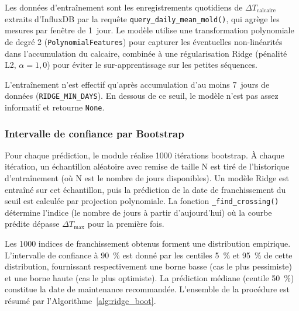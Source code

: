 Les données d'entraînement sont les enregistrements quotidiens de \(\Delta T_{\text{calcaire}}\) extraits d'InfluxDB par la requête \texttt{query\_daily\_mean\_mold()}, qui agrège les mesures par fenêtre de 1~jour. Le modèle utilise une transformation polynomiale de degré 2 (\texttt{PolynomialFeatures}) pour capturer les éventuelles non-linéarités dans l'accumulation du calcaire, combinée à une régularisation Ridge (pénalité L2, \(\alpha = 1,0\)) pour éviter le sur-apprentissage sur les petites séquences.

L'entraînement n'est effectif qu'après accumulation d'au moins 7~jours de données (\texttt{RIDGE\_MIN\_DAYS}). En dessous de ce seuil, le modèle n'est pas assez informatif et retourne \texttt{None}.

\subsubsection{Intervalle de confiance par Bootstrap}

Pour chaque prédiction, le module réalise 1000 itérations bootstrap. À chaque itération, un échantillon aléatoire avec remise de taille N est tiré de l'historique d'entraînement (où N est le nombre de jours disponibles). Un modèle Ridge est entraîné sur cet échantillon, puis la prédiction de la date de franchissement du seuil est calculée par projection polynomiale. La fonction \texttt{\_find\_crossing()} détermine l'indice (le nombre de jours à partir d'aujourd'hui) où la courbe prédite dépasse \(\Delta T_{\text{max}}\) pour la première fois.

Les 1000 indices de franchissement obtenus forment une distribution empirique. L'intervalle de confiance à 90~\% est donné par les centiles 5~\% et 95~\% de cette distribution, fournissant respectivement une borne basse (cas le plus pessimiste) et une borne haute (cas le plus optimiste). La prédiction médiane (centile 50~\%) constitue la date de maintenance recommandée. L'ensemble de la procédure est résumé par l'Algorithme~\ref{alg:ridge_boot}.

